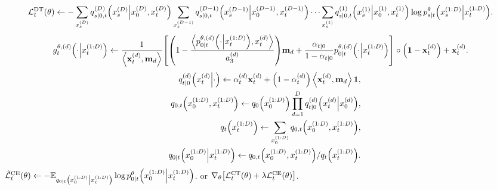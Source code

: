 \documentclass[10pt]{article}
\begin{document}
\begin{algorithm}
\begin{algorithmic}
    \EndFor
    \State
    {\color{red}
    \begin{eqnarray*}
      \mathcal{L}^\text{DT}_t(\theta)\gets - \sum_{x_s^{(D)}}q^{(D)}_{s|0,t}\qty(x_s^{(D)}\middle|x_0^{(D)}, x_t^{(D)})\sum_{x_s^{(D-1)}}q^{(D-1)}_{s|0,t}\qty(x_s^{(D-1)}\middle|x_0^{(D-1)}, x_t^{(D-1)})\cdots\sum_{x_s^{(1)}} q^{(1)}_{s|0,t}\qty(x_s^{(1)}\middle|x_0^{(1)}, x_t^{(1)})\log p^\theta_{s|t}\qty(x_s^{(1:D)}\middle|x_t^{(1:D)}).
    \end{eqnarray*}
    }
    \State
    {\color{blue}
    \begin{eqnarray*}
      g^{\theta,(d)}_t\qty(\cdot\middle|x^{(1:D)}_t)\gets \frac{1}{\left\langle \mathbf{x}^{(d)}_t,\mathbf{m}_d\right\rangle}\qty[\qty(1-\frac{\left\langle p^{\theta,(d)}_{0|t}\qty(\cdot\middle|x^{(1:D)}_t),x^{(d)}_t\right\rangle}{a^{(d)}_3})\mathbf{m}_d + \frac{\alpha_{t|0}}{1-\alpha_{t|0}}p^{\theta,(d)}_{0|t}\qty(\cdot\middle|x^{(1:D)}_t)]\circ \qty(\mathbf{1}-\mathbf{x}^{(d)}_t) + \mathbf{x}^{(d)}_t.
    \end{eqnarray*}
    }
    \State
    \begin{eqnarray*}
      &&q^{(d)}_{t|0}\qty(x^{(d)}_t\middle|\cdot) \gets \alpha^{(d)}_t \mathbf{x}^{(d)}_t + \qty(1 - \alpha^{(d)}_t)\left\langle\mathbf{x}^{(d)}_t, \mathbf{m}_d\right\rangle\mathbf{1},\\
      &&q_{0,t}\qty(x^{(1:D)}_0, x^{(1:D)}_t) \gets q_0\qty(x^{(1:D)}_0)\prod_{d=1}^D q^{(d)}_{t|0}\qty(x^{(d)}_t\middle|x^{(d)}_0),\\
      &&q_t\qty(x^{(1:D)}_t) \gets \sum_{x^{(1:D)}_0}q_{0,t}\qty(x^{(1:D)}_0, x^{(1:D)}_t),\\
      &&q_{0|t}\qty(x^{(1:D)}_0\middle|x^{(1:D)}_t) \gets q_{0,t}\qty(x^{(1:D)}_0, x^{(1:D)}_t) / q_t\qty(x^{(1:D)}_t).
    \end{eqnarray*}
    \State $\tilde{\mathcal{L}}^\text{CE}_t(\theta)\gets -\mathbb{E}_{q_{0|t}\qty(x^{(1:D)}_0\middle|x^{(1:D)}_t)}\log p^\theta_{0|t}\qty(x^{(1:D)}_0\middle|x^{(1:D)}_t)$.
     or {\color{blue} $\nabla_\theta\qty[\mathcal{L}^\text{CT}_t(\theta) + \lambda \mathcal{L}^\text{CE}_t(\theta)]$}.
  \end{algorithmic}
\end{algorithm}
\end{document}
